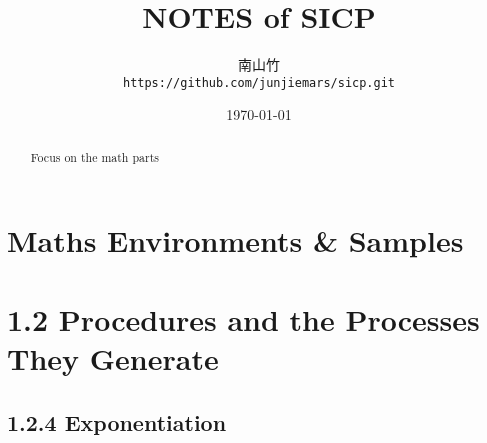 \documentclass{article}
\begin{document}
\title{NOTES of SICP}
\author{南山竹\\
  \texttt{https://github.com/junjiemars/sicp.git}}
\date{\today}
\maketitle

\begin{abstract}
Focus on the math parts
\end{abstract}

\section*{Maths Environments \& Samples}


\section*{1.2 Procedures and the Processes They Generate}

\subsection*{1.2.4 Exponentiation}
\end{document}
